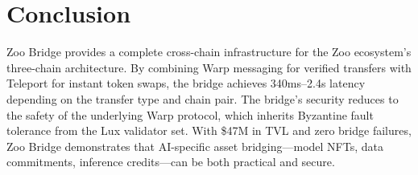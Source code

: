 \section{Conclusion}


Zoo Bridge provides a complete cross-chain infrastructure for the Zoo ecosystem's three-chain architecture. By combining Warp messaging for verified transfers with Teleport for instant token swaps, the bridge achieves 340ms--2.4s latency depending on the transfer type and chain pair. The bridge's security reduces to the safety of the underlying Warp protocol, which inherits Byzantine fault tolerance from the Lux validator set. With \$47M in TVL and zero bridge failures, Zoo Bridge demonstrates that AI-specific asset bridging---model NFTs, data commitments, inference credits---can be both practical and secure.

